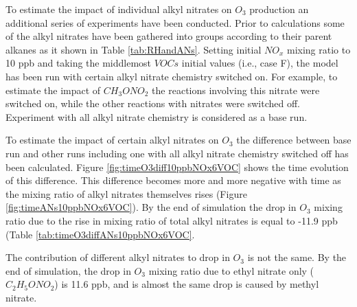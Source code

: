 \documentclass[11pt,a4paper]{article}
\begin{document}
To estimate the impact of individual alkyl nitrates on $O_3$ production an additional series of experiments have been conducted. Prior to calculations some of the alkyl nitrates have been gathered into groups according to their parent alkanes as it shown in Table \ref{tab:RHandANs}. Setting initial $NO_x$ mixing ratio to 10 ppb and taking the middlemost $VOCs$ initial values (i.e., case F), the model has been run with certain alkyl nitrate chemistry switched on. For example, to estimate the impact of $CH_3ONO_2$ the reactions involving this nitrate were switched on, while the other reactions with nitrates were switched off. Experiment with all alkyl nitrate chemistry is considered as a base run.

To estimate the impact of certain alkyl nitrates on $O_3$ the difference between base run and other runs including one with all alkyl nitrate chemistry switched off has been calculated. Figure \ref{fig:timeO3diff10ppbNOx6VOC} shows the time evolution of this difference. This difference becomes more and more negative with time as the mixing ratio of alkyl nitrates themselves rises (Figure \ref{fig:timeANs10ppbNOx6VOC}). By the end of simulation the drop in $O_3$ mixing ratio due to the rise in mixing ratio of total alkyl nitrates is equal to -11.9 ppb (Table \ref{tab:timeO3diffANs10ppbNOx6VOC}.

The contribution of different alkyl nitrates to drop in $O_3$ is not the same. By the end of simulation, the drop in $O_3$ mixing ratio due to ethyl nitrate only ($C_2H_5ONO_2$) is 11.6 ppb, and is almost the same drop is caused by methyl nitrate.
\end{document}

